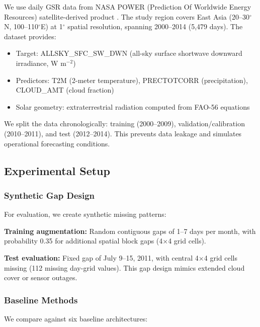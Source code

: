 \documentclass[preprint,12pt]{elsarticle}
\begin{document}
We use daily GSR data from NASA POWER (Prediction Of Worldwide Energy Resources) satellite-derived product \cite{stackhouse2011power}. The study region covers East Asia (20--30$^\circ$N, 100--110$^\circ$E) at 1$^\circ$ spatial resolution, spanning 2000--2014 (5,479 days). The dataset provides:

\begin{itemize}
\item Target: ALLSKY\_SFC\_SW\_DWN (all-sky surface shortwave downward irradiance, W m$^{-2}$)
\item Predictors: T2M (2-meter temperature), PRECTOTCORR (precipitation), CLOUD\_AMT (cloud fraction)
\item Solar geometry: extraterrestrial radiation computed from FAO-56 equations \cite{allen1998crop}
\end{itemize}

We split the data chronologically: training (2000--2009), validation/calibration (2010--2011), and test (2012--2014). This prevents data leakage and simulates operational forecasting conditions.

\subsection{Experimental Setup}

\subsubsection{Synthetic Gap Design}

For evaluation, we create synthetic missing patterns:

\textbf{Training augmentation:} Random contiguous gaps of 1--7 days per month, with probability 0.35 for additional spatial block gaps (4$\times$4 grid cells).

\textbf{Test evaluation:} Fixed gap of July 9--15, 2011, with central 4$\times$4 grid cells missing (112 missing day-grid values). This gap design mimics extended cloud cover or sensor outages.

\subsubsection{Baseline Methods}

We compare against six baseline architectures:
\end{document}
